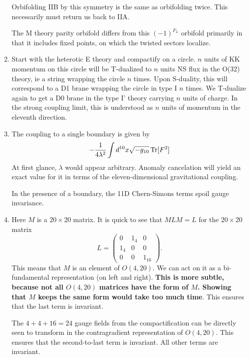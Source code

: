 \documentclass[11pt, class=article, crop=false]{standalone}
\begin{document}
\begin{enumerate}
	Orbifolding IIB by this symmetry is the same as orbifolding twice. This necessarily must return us back to IIA. 
	
	The M theory parity orbifold differs from this $(-1)^{F_L}$ orbifold primarily in that it includes fixed points, on which the twisted sectors localize. 
	
	\item Start with the heterotic E theory and compactify on a circle. $n$ units of KK momentum on this circle will be T-dualized to $n$ units NS flux in the O(32) theory, ie a string wrapping the circle $n$ times. Upon S-duality, this will correspond to a D1 brane wrapping the circle in type I $n$ times. We T-dualize again to get a D0 brane in the type I' theory carrying $n$ units of charge. In the strong coupling limit, this is understood as $n$ units of momentum in the eleventh direction.  
	
	\item The coupling to a single boundary is given by
	\[
		-\frac{1}{4 \lambda^2} \int d^{10} x \sqrt{-g_{10}} \,\mathrm{Tr}[F^2]
	\]
	At first glance, $\lambda$ would appear arbitrary. Anomaly cancelation will yield an exact value for it in terms of the eleven-dimensional gravitational coupling.
	
	In the presence of a boundary, the 11D Chern-Simons terms spoil gauge invariance.
	
	\item Here $M$ is a $20 \times 20$ matrix. It is quick to see that $M L M = L$ for the $20 \times 20$ matrix 
	\[
		L = \begin{pmatrix}
			0 & 1_4 & 0\\
			1_4 & 0 & 0\\
			0 & 0 & 1_{16}
		\end{pmatrix}.
	\]
	This means that $M$ is an element of $O(4,20)$. We can act on it as a bi-fundamental representation (on left and right). \textbf{This is more subtle, because not all $O(4, 20)$ matrices have the form of $M$. Showing that $M$ keeps the same form would take too much time}.  This ensures that the last term is invariant.
	
	The $4+4+16 = 24$ gauge fields from the compactification can be directly seen to transform in the contragradient representation of $O(4,20)$. This ensures that the second-to-last term is invariant. All other terms are invariant.
	

\end{enumerate}
\end{document}
